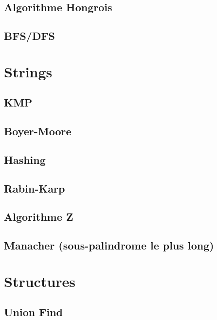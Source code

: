 \documentclass[10pt]{extarticle}
\begin{document}
\subsection{Algorithme Hongrois}
{\scriptsize}

\subsection{BFS/DFS}
{\scriptsize}


\section{Strings}
\subsection{KMP}
{\scriptsize}

\subsection{Boyer-Moore}
{\scriptsize}

\subsection{Hashing}
{\scriptsize}

\subsection{Rabin-Karp}
{\scriptsize}

\subsection{Algorithme Z}
{\scriptsize}

\subsection{Manacher (sous-palindrome le plus long)}
{\scriptsize}


\section{Structures}
\subsection{Union Find}
{\scriptsize}
\end{document}
